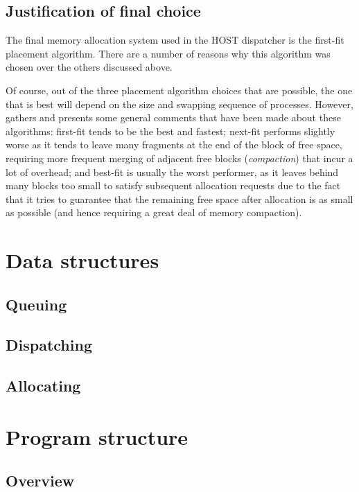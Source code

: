 \documentclass[12pt]{article}
\begin{document}
\subsection{Justification of final choice}
The final memory allocation system used in the HOST dispatcher is the first-fit
placement algorithm. There are a number of reasons why this algorithm was
chosen over the others discussed above.

Of course, out of the three placement algorithm choices that are possible, the
one that is best will depend on the size and swapping sequence of processes.
However, \cite{stallings:2012} gathers and presents some general comments that
have been made about these algorithms: first-fit tends to be the best and
fastest; next-fit performs slightly worse as it tends to leave many fragments
at the end of the block of free space, requiring more frequent merging of
adjacent free blocks (\textit{compaction}) that incur a lot of overhead; and
best-fit is usually the worst performer, as it leaves behind many blocks too
small to satisfy subsequent allocation requests due to the fact that it tries
to guarantee that the remaining free space after allocation is as small as
possible (and hence requiring a great deal of memory compaction).

\section{Data structures}

\subsection{Queuing}

\subsection{Dispatching}

\subsection{Allocating}

\section{Program structure}

\subsection{Overview}
\end{document}
